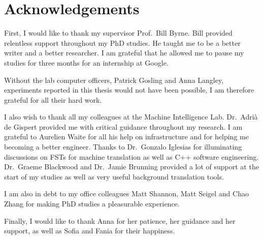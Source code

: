 \chapter*{Acknowledgements}

First, I would like to thank my supervisor
Prof.\ Bill Byrne.
Bill provided relentless support throughout
my PhD studies.
He taught me to be a better writer and a better researcher.
I am grateful that he allowed
me to pause my studies for three months for
an internship at Google.

Without the lab computer officers, Patrick Gosling
and Anna Langley, experiments reported in this thesis
would not have been possible, I am therefore
grateful for all their hard work.

I also wish to thank all my colleagues at
the Machine Intelligence Lab.
Dr.\ Adrià de Gispert provided me with
critical guidance throughout my research.
I am grateful to Aurelien Waite for all his
help on infrastructure and for helping me becoming
a better engineer.
Thanks to Dr.\ Gonzalo Iglesias for illuminating
discussions on FSTs for machine translation as well
as C++ software engineering.
Dr.\ Graeme Blackwood and Dr.\ Jamie Brunning
provided a lot of support at the start of my studies as
well as very useful background translation tools.

I am also in debt to my office colleagues Matt Shannon, Matt Seigel
and Chao Zhang for making PhD studies a pleasurable experience.

Finally, I would like to thank Anna for her patience, her guidance and
her support, as well as Sofia and Fania for their happiness.
